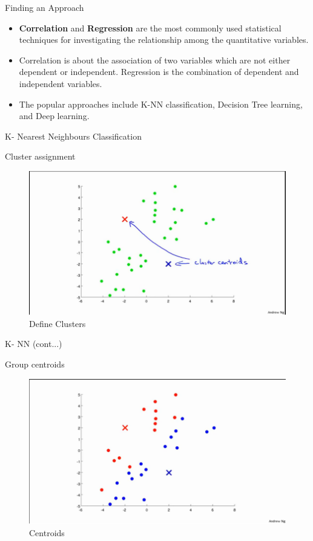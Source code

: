 \documentclass{beamer}
\begin{document}
\begin{frame}{Finding an Approach}
    \begin{itemize}
        \item \textbf{Correlation} and \textbf{Regression} are the most commonly used statistical techniques for investigating the relationship among the quantitative variables.
        \item Correlation is about the association of two variables which are not either dependent or independent. Regression is the combination of dependent and independent variables.
        \item The popular approaches include K-NN classification, Decision Tree learning, and Deep learning.
    \end{itemize}
\end{frame}
\begin{frame}{K- Nearest Neighbours Classification}
    \item Cluster assignment
    \begin{figure}
        \centering
        \includegraphics[width=.8\textwidth]{fig/k1.png}
        \caption{Define Clusters}
        \label{fig:Define Clusters}
    \end{figure}
\end{frame}
\begin{frame}{K- NN (cont...)}
    \item Group centroids
    \begin{figure}
        \centering
        \includegraphics[width=.8\textwidth]{fig/k2.png}
        \caption{Centroids}
        \label{fig:Centroids}
    \end{figure}
\end{frame}
\end{document}
